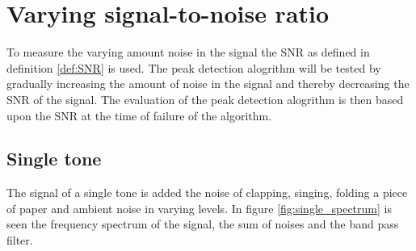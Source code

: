 \section{Varying signal-to-noise ratio}
To measure the varying amount noise in the signal the SNR as defined in definition \ref{def:SNR} is used. The peak detection alogrithm will be tested by gradually increasing the amount of noise in the signal and thereby decreasing the SNR of the signal. The evaluation of the peak detection alogrithm is then based upon the SNR at the time of failure of the algorithm.
\subsection{Single tone}
The signal of a single tone is added the noise of clapping, singing, folding a piece of paper and ambient noise in varying levels. In figure \ref{fig:single_spectrum} is seen the frequency spectrum of the signal, the sum of noises and the band pass filter.

